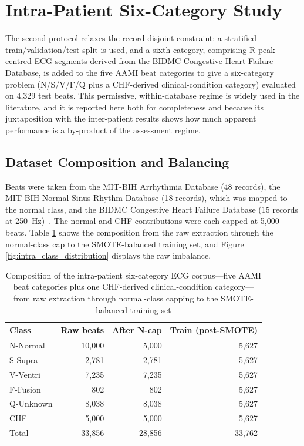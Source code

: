 \section{Intra-Patient Six-Category Study}
\label{sec:intra}

The second protocol relaxes the record-disjoint constraint: a stratified
train/validation/test split is used, and a sixth category, comprising
R-peak-centred ECG segments derived from the BIDMC Congestive Heart Failure
Database, is added to the five AAMI beat categories to give a six-category
problem (N/S/V/F/Q plus a CHF-derived clinical-condition category)
evaluated on 4{,}329 test beats. This permissive, within-database regime is
widely used in the literature, and it is reported here both for completeness
and because its juxtaposition with the inter-patient results shows how much
apparent performance is a by-product of the assessment regime.

\subsection{Dataset Composition and Balancing}
\label{subsec:intra_data}

Beats were taken from the MIT-BIH Arrhythmia Database (48 records), the
MIT-BIH Normal Sinus Rhythm Database (18 records), which was mapped to the
normal class, and the BIDMC Congestive Heart Failure Database (15 records
at 250~Hz)~\cite{moody2001mitbih,goldberger2000physionet,baim1986chf}. The
normal and CHF contributions were each capped at 5{,}000 beats. Table
\ref{tab:intra_data} shows the composition from the raw extraction through
the normal-class cap to the SMOTE-balanced training set, and Figure
\ref{fig:intra_class_distribution} displays the raw imbalance.

\begin{table}[!t]
\centering
\caption[Composition of the intra-patient six-category ECG corpus]{Composition of the intra-patient six-category ECG corpus---five AAMI beat categories plus one CHF-derived clinical-condition category---from raw extraction through normal-class capping to the SMOTE-balanced training set}
\label{tab:intra_data}
\begin{tabular}{lrrr}
\toprule
\textbf{Class} & \textbf{Raw beats} & \textbf{After N-cap} & \textbf{Train (post-SMOTE)} \\
\midrule
N-Normal  & 10{,}000 & 5{,}000 & 5{,}627 \\
S-Supra   &  2{,}781 & 2{,}781 & 5{,}627 \\
V-Ventri  &  7{,}235 & 7{,}235 & 5{,}627 \\
F-Fusion  &    802  &    802  & 5{,}627 \\
Q-Unknown &  8{,}038 & 8{,}038 & 5{,}627 \\
CHF       &  5{,}000 & 5{,}000 & 5{,}627 \\
\midrule
Total     & 33{,}856 & 28{,}856 & 33{,}762 \\
\bottomrule
\end{tabular}
\end{table}

